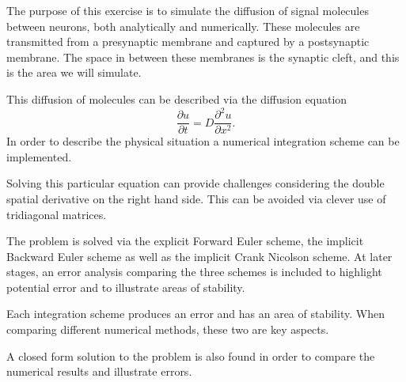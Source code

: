 The purpose of this exercise is to simulate the diffusion of signal
molecules between neurons, both analytically and numerically. These
molecules are transmitted from a presynaptic membrane and captured
by a postsynaptic membrane. The space in between these membranes is
the synaptic cleft, and this is the area we will simulate.

This diffusion of molecules can be described via the diffusion
equation \[ \frac{\partial u}{\partial t} = D\frac{\partial^2
u}{\partial x^2}. \] In order to describe the physical situation
a numerical integration scheme can be implemented.

Solving this particular equation can provide challenges considering
the double spatial derivative on the right hand side. This can be
avoided via clever use of tridiagonal matrices.

The problem is solved via the explicit Forward Euler scheme, the
implicit Backward Euler scheme as well as the implicit Crank
Nicolson scheme. At later stages, an error analysis comparing the
three schemes is included to highlight potential error and to
illustrate areas of stability.

Each integration scheme produces an error and has an area of
stability. When comparing different numerical methods, these two
are key aspects.

A closed form solution to the problem is also found in order to
compare the numerical results and illustrate errors.
